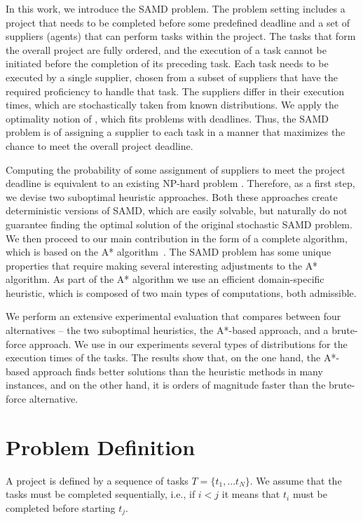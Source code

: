 \documentclass[letterpaper]{article}
\newcommand{\samd}{\ac{SAMD}\xspace}
\newcommand{\astar}{\textsc{A*}\xspace}
\begin{document}
In this work, we introduce the \samd problem.
The problem setting includes a project that needs to be completed before some predefined deadline and a set of suppliers (agents) that can perform tasks within the project. The tasks that form the overall project are fully ordered, and the execution of a task cannot be initiated before the completion of its preceding task.
Each task needs to be executed by a single supplier, chosen from a subset of suppliers that have the required proficiency to handle that task. The suppliers differ in their execution times, which are stochastically taken from known distributions.
We apply the optimality notion of \citeauthor{frank1969shortest}, which fits problems with deadlines.
Thus, the \samd problem is of assigning a supplier to each task in a manner that maximizes the chance to meet the overall project deadline.

Computing the probability of some assignment of suppliers to meet the project deadline is equivalent to an existing NP-hard problem \cite{cohen2015estimating}. Therefore, as a first step, we devise two suboptimal heuristic approaches. Both these approaches create deterministic versions of \samd, which are easily solvable, but naturally do not guarantee finding the optimal solution of the original stochastic \samd problem. We then proceed to our main contribution in the form of a complete algorithm, which is based on the \astar algorithm~\cite{hart1968formal}. The \samd problem has some unique properties that require making several interesting adjustments to the \astar algorithm. As part of the \astar algorithm we use an efficient domain-specific heuristic, which is composed of two main types of computations, both admissible.

We perform an extensive experimental evaluation that compares between four alternatives -- the two suboptimal heuristics, the \astar-based approach, and a brute-force approach.
We use in our experiments several types of distributions for the execution times of the tasks. The results show that, on the one hand, the \astar-based approach finds better solutions than the heuristic methods in many instances, and on the other hand, it is orders of magnitude faster than the brute-force alternative.

\section{Problem Definition}
\label{sec:def}

A project is defined by a sequence of tasks $T=\{t_1,\ldots t_N\}$. We assume that the tasks must be completed sequentially, i.e., if $i<j$ it means that $t_i$ must be completed before starting $t_j$.
\end{document}
